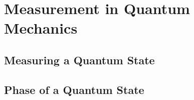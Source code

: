 \section{Measurement in Quantum Mechanics}
\subsection{Measuring a Quantum State}
\subsection{Phase of a Quantum State}